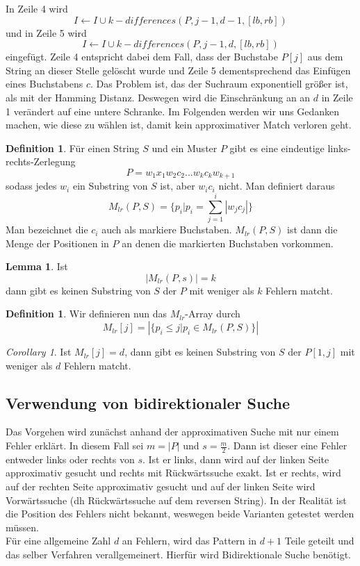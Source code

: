 \documentclass[a4paper, 12pt]{article}
\theoremstyle{plain}
\theoremstyle{definition}
\newtheorem{definition}[theorem]{Definition} %
\theoremstyle{lemma}
\newtheorem{lemma}[theorem]{Lemma}
\theoremstyle{remark}
\theoremstyle{corollary}
\newtheorem{corollary}[theorem]{Corollary}
\theoremstyle{example}
\begin{document}
	In Zeile 4 wird \[I \gets I \cup k-differences(P,j-1,d-1,[lb,rb])\] und in Zeile 5 wird \[I \gets I \cup k-differences(P,j-1,d,[lb,rb])\] eingefügt. Zeile 4 entspricht dabei dem Fall, dass der Buchstabe $P[j]$ aus dem String an dieser Stelle gelöscht wurde und Zeile 5 dementsprechend das Einfügen eines Buchstabens $c$. Das Problem ist, das der Suchraum exponentiell größer ist, als mit der Hamming Distanz. Deswegen wird die Einschränkung an an $d$ in Zeile 1 verändert auf eine untere Schranke. Im Folgenden werden wir uns Gedanken machen, wie diese zu wählen ist, damit kein approximativer Match verloren geht.
	\begin{definition}
		Für einen String $S$ und ein Muster $P$ gibt es eine eindeutige links-rechts-Zerlegung \[P = w_1x_1w_2c_2...w_kc_kw_{k+1}\] sodass jedes $w_i$ ein Substring von $S$ ist, aber $w_ic_i$ nicht. Man definiert daraus \[M_{lr}(P,S) = \{p_i | p_i = \sum_{j=1}^{i}\left|w_jc_j\right|\}\] Man bezeichnet die $c_i$ auch als markiere Buchstaben. $M_{lr}(P,S)$ ist dann die Menge der Positionen in $P$ an denen die markierten Buchstaben vorkommen.
	\end{definition}
	\begin{lemma}
		Ist \[\left|M_{lr}(P,s)\right| = k\] dann gibt es keinen Substring von $S$ der $P$ mit weniger als $k$ Fehlern matcht.
	\end{lemma}
	\begin{definition}
		Wir definieren nun das $M_{lr}$-Array durch \[M_{lr}[j] = \left|\{p_i \leq j | p_i \in M_{lr}(P,S)\}\right|\]
	\end{definition}
	\begin{corollary}
		Ist $M_{lr}[j] = d$, dann gibt es keinen Substring von $S$ der $P[1,j]$ mit weniger als $d$ Fehlern matcht.
	\end{corollary}
	\subsection{Verwendung von bidirektionaler Suche}
	Das Vorgehen wird zunächst anhand der approximativen Suche mit nur einem Fehler erklärt. In diesem Fall sei $m=\left|P\right|$ und $s = \frac{m}{2}$. Dann ist dieser eine Fehler entweder links oder rechts von $s$. Ist er links, dann wird auf der linken Seite approximativ gesucht und rechts mit Rückwärtssuche exakt. Ist er rechts, wird auf der rechten Seite approximativ gesucht und auf der linken Seite wird Vorwärtssuche (dh Rückwärtssuche auf dem reversen String). In der Realität ist die Position des Fehlers nicht bekannt, weswegen beide Varianten getestet werden müssen.\\
	Für eine allgemeine Zahl $d$ an Fehlern, wird das Pattern in $d+1$ Teile geteilt und das selber Verfahren verallgemeinert. Hierfür wird Bidirektionale Suche benötigt.
\end{document}
